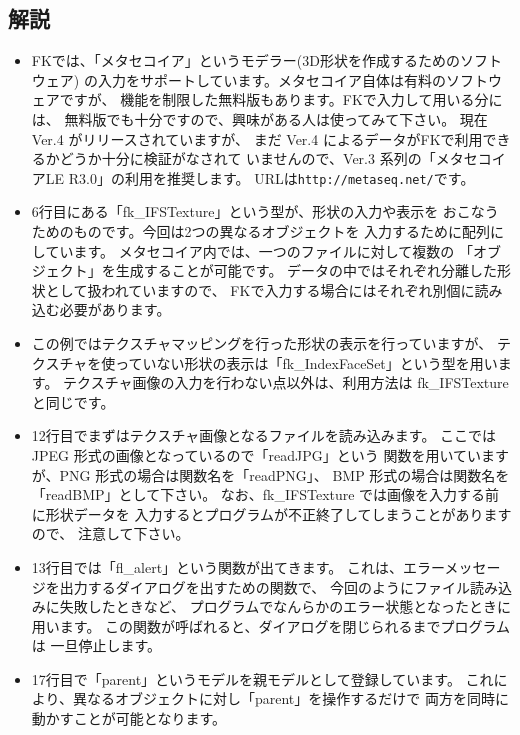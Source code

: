 \subsection*{解説}
\begin{itemize}
 \item FKでは、「メタセコイア」というモデラー(3D形状を作成するためのソフトウェア)
	の入力をサポートしています。メタセコイア自体は有料のソフトウェアですが、
	機能を制限した無料版もあります。FKで入力して用いる分には、
	無料版でも十分ですので、興味がある人は使ってみて下さい。
	現在 Ver.4 がリリースされていますが、
	まだ Ver.4 によるデータがFKで利用できるかどうか十分に検証がなされて
	いませんので、Ver.3 系列の「メタセコイアLE R3.0」の利用を推奨します。
	URLは\verb+http://metaseq.net/+です。


 \item 6行目にある「fk\_IFSTexture」という型が、形状の入力や表示を
	おこなうためのものです。今回は2つの異なるオブジェクトを
	入力するために配列にしています。
	メタセコイア内では、一つのファイルに対して複数の
	「オブジェクト」を生成することが可能です。
	データの中ではそれぞれ分離した形状として扱われていますので、
	FKで入力する場合にはそれぞれ別個に読み込む必要があります。

 \item この例ではテクスチャマッピングを行った形状の表示を行っていますが、
	テクスチャを使っていない形状の表示は「fk\_IndexFaceSet」という型を用います。
	テクスチャ画像の入力を行わない点以外は、利用方法は fk\_IFSTexture と同じです。

 \item 12行目でまずはテクスチャ画像となるファイルを読み込みます。
	ここでは JPEG 形式の画像となっているので「readJPG」という
	関数を用いていますが、PNG 形式の場合は関数名を「readPNG」、
	BMP 形式の場合は関数名を「readBMP」として下さい。
	なお、fk\_IFSTexture では画像を入力する前に形状データを
	入力するとプログラムが不正終了してしまうことがありますので、
	注意して下さい。

 \item 13行目では「fl\_alert」という関数が出てきます。
	これは、エラーメッセージを出力するダイアログを出すための関数で、
	今回のようにファイル読み込みに失敗したときなど、
	プログラムでなんらかのエラー状態となったときに用います。
	この関数が呼ばれると、ダイアログを閉じられるまでプログラムは
	一旦停止します。

 \item 17行目で「parent」というモデルを親モデルとして登録しています。
	これにより、異なるオブジェクトに対し「parent」を操作するだけで
	両方を同時に動かすことが可能となります。


\end{itemize}
